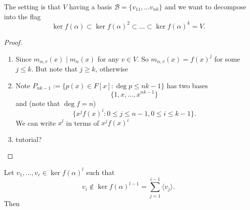 \documentclass{scrartcl}
\def\le{\leqslant}
\def\ge{\geqslant}
\def\B{\mathcal{B}}
\begin{document}
\begin{remark}
	The setting is that $V$ having a basis $\B = \{v_{11}, \dots v_{nk}\}$ and we want to decompose into the flag
	\[\ker{f(\alpha)} \subset \ker{f(\alpha)}^2 \subset \dots \subset \ker{f(\alpha)}^k = V.\]
\end{remark}
\begin{proof}
	\begin{enumerate}
		\item Since $m_{\alpha, v}(x) \mid m_\alpha(x)$ for any $v \in V$. So $m_{\alpha, v}(x) = f(x)^j$ for some $j \le k$. But note that $j \ge k$, otherwise 
		\item Note $P_{nk-1} := \{p(x) \in F[x]: \deg{p} \le nk-1\}$ has two bases
		\[\{1, x, \dots, x^{nk-1}\}\]
		and (note that $\deg{f}=n$)
		\[\{x^jf(x)^i: 0 \le j \le n-1, 0 \le i \le k-1\}.\]
		We can write $x^l$ in terms of $x^jf(x)^i$
		\item tutorial?
	\end{enumerate}
\end{proof}
\begin{lemma}
	Let $v_1, \dots, v_r \in \ker{f(\alpha)^l}$ such that
	\[v_i \notin \ker{f(\alpha)^{l-1}} = \sum_{j=1}^{i-1} \langle v_j \rangle.\]
	Then 
\end{lemma}
\end{document}
